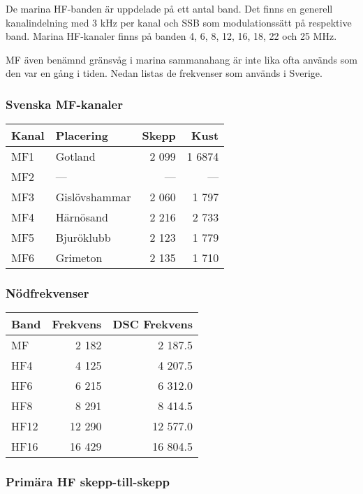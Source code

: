 De marina HF-banden är uppdelade på ett antal band. Det finns en
generell kanalindelning med 3 kHz per kanal och SSB som
modulationssätt på respektive band. Marina HF-kanaler finns på banden
4, 6, 8, 12, 16, 18, 22 och 25 MHz.

MF även benämnd gränsvåg i marina sammanahang är inte lika ofta
används som den var en gång i tiden. Nedan listas de frekvenser som
används i Sverige.

\subsubsection{Svenska MF-kanaler}

\begin{longtable}{llrr}
\textbf{Kanal} & \textbf{Placering} & \textbf{Skepp} & \textbf{Kust}  \\ \hline
\endhead

MF1 & Gotland       & 2 099 & 1 6874 \\
MF2 & ---           & ---  & ---   \\
MF3 & Gislövshammar & 2 060 & 1 797  \\
MF4 & Härnösand     & 2 216 & 2 733  \\
MF5 & Bjuröklubb    & 2 123 & 1 779  \\
MF6 & Grimeton      & 2 135 & 1 710
\end{longtable}

\subsubsection{Nödfrekvenser}

\begin{longtable}{lrr}
\textbf{Band} & \textbf{Frekvens} & \textbf{DSC Frekvens}\\ \hline \endhead

MF   & 2 182  & 2 187.5  \\
HF4  & 4 125  & 4 207.5  \\
HF6  & 6 215  & 6 312.0  \\
HF8  & 8 291  & 8 414.5  \\
HF12 & 12 290 & 12 577.0 \\
HF16 & 16 429 & 16 804.5 \\
\end{longtable}

\subsubsection{Primära HF skepp-till-skepp}

